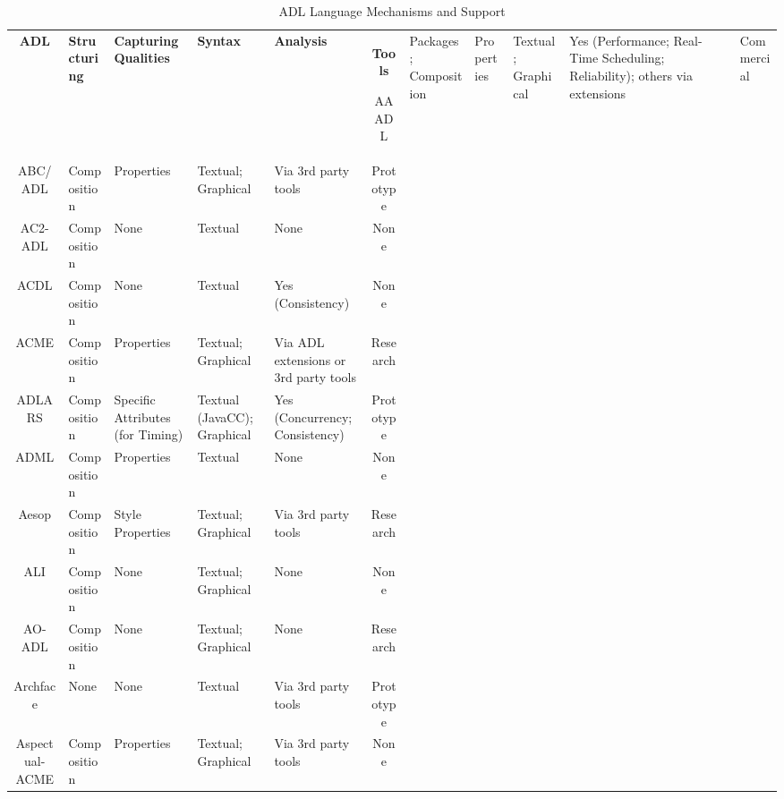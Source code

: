 \begin{landscape}
\footnotesize
\begin{longtable}{|c|P{2cm}|P{3cm}|P{3cm}|p{2cm}|c|} 
\label{table:adl-mechanisms} \\
\caption{ADL Language Mechanisms and Support} \\
\hline

\textbf{ADL} & \textbf{Structuring} & \textbf{Capturing Qualities} & \textbf{Syntax} & \textbf{Analysis} & \textbf{Tools}
\endhead

\hline

AAADL & Packages; Composition & Properties & Textual; Graphical & Yes (Performance; Real-Time Scheduling; Reliability); others via extensions & Commercial \\
\hline

ABC/ADL & Composition & Properties & Textual; Graphical & Via 3rd party tools & Prototype \\
\hline

AC2-ADL & Composition & None & Textual & None & None \\
\hline
ACDL & Composition & None & Textual & Yes (Consistency) & None \\ 
\hline

ACME & Composition & Properties & Textual; Graphical & Via ADL extensions or 3rd party tools & Research \\ 
\hline

ADLARS & Composition & Specific Attributes (for Timing) & Textual (JavaCC); Graphical & Yes (Concurrency; Consistency) & Prototype \\ 
\hline

ADML & Composition & Properties & Textual & None & None \\ 
\hline

Aesop & Composition & Style Properties & Textual; Graphical & Via 3rd party tools & Research \\ 
\hline

ALI & Composition & None & Textual; Graphical & None & None \\ 
\hline

AO-ADL & Composition & None & Textual; Graphical & None & Research \\ 
\hline

Archface & None & None & Textual & Via 3rd party tools & Prototype \\ 
\hline

Aspectual-ACME & Composition & Properties & Textual; Graphical & Via 3rd party tools & None \\ 
\hline


\end{longtable}
\end{landscape}
